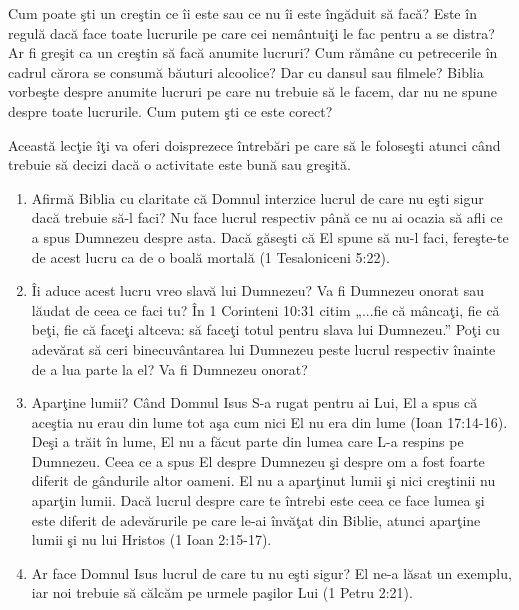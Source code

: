 \newpage


Cum poate şti un creştin ce îi este sau ce nu îi este îngăduit să facă? Este în regulă dacă face toate lucrurile pe care cei nemântuiţi le fac pentru a se distra? Ar fi greşit ca un creştin să facă anumite lucruri? Cum rămâne cu petrecerile în cadrul cărora se consumă băuturi alcoolice? Dar cu dansul sau filmele? Biblia vorbeşte despre anumite lucruri pe care nu trebuie să le facem, dar nu ne spune despre toate lucrurile. Cum putem şti ce este corect?

Această lecţie îţi va oferi doisprezece întrebări pe care să le foloseşti atunci când trebuie să decizi dacă  o activitate este bună sau greşită.

\begin{enumerate}

	\item Afirmă Biblia cu claritate că Domnul interzice lucrul de care nu eşti sigur dacă trebuie să-l faci? Nu face lucrul respectiv până ce nu ai ocazia să afli ce a spus Dumnezeu despre asta. Dacă găseşti că El spune să nu-l faci, fereşte-te de acest lucru ca de o boală mortală (1 Tesaloniceni 5:22).
	
	\item Îi aduce acest lucru vreo slavă lui Dumnezeu? Va fi Dumnezeu onorat sau lăudat de ceea ce faci tu? În 1 Corinteni 10:31 citim „...fie că mâncaţi, fie că beţi, fie că faceţi altceva: să faceţi totul pentru slava lui Dumnezeu.” Poţi cu adevărat să ceri binecuvântarea lui Dumnezeu peste lucrul respectiv înainte de a lua parte la el? Va fi Dumnezeu onorat?
	
	\item Aparţine lumii? Când Domnul Isus S-a rugat pentru ai Lui, El a spus că aceştia nu erau din lume tot aşa cum nici El nu era din lume (Ioan 17:14-16). Deşi a trăit în lume, El nu a făcut parte din lumea care L-a respins pe Dumnezeu. Ceea ce a spus El despre Dumnezeu şi despre om a fost foarte diferit de gândurile altor oameni. El nu a aparţinut lumii şi nici creştinii nu aparţin lumii. Dacă lucrul despre care te întrebi este ceea ce face lumea şi este diferit de adevărurile pe care le-ai învăţat din Biblie, atunci aparţine lumii şi nu lui Hristos (1 Ioan 2:15-17).
	
	\item Ar face Domnul Isus lucrul de care tu nu eşti sigur? El ne-a lăsat un exemplu, iar noi trebuie să călcăm pe urmele paşilor Lui (1 Petru 2:21).
	

\end{enumerate}
